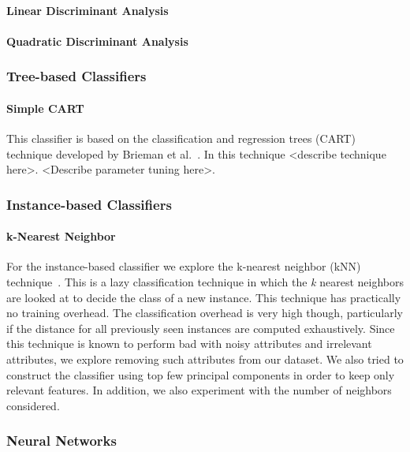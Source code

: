 \paragraph{Linear Discriminant Analysis}



\paragraph{Quadratic Discriminant Analysis}



\subsubsection{Tree-based Classifiers}

\paragraph{Simple CART}

This classifier is based on the classification and regression trees (CART) technique developed by Brieman et al.~\cite{CART}. In this technique <describe technique here>. <Describe parameter tuning here>.

\subsubsection{Instance-based Classifiers}

\paragraph{k-Nearest Neighbor}

For the instance-based classifier we explore the k-nearest neighbor (kNN) technique~\cite{kNN}. This is a lazy classification technique in which the \emph{k} nearest neighbors are looked at to decide the class of a new instance. This technique has practically no training overhead. The classification overhead is very high though, particularly if the distance for all previously seen instances are computed exhaustively. Since this technique is known to perform bad with noisy attributes and irrelevant attributes, we explore removing such attributes from our dataset. We also tried to construct the classifier using top few principal components in order to keep only relevant features. In addition, we also experiment with the number of neighbors considered.


\subsubsection{Neural Networks}

